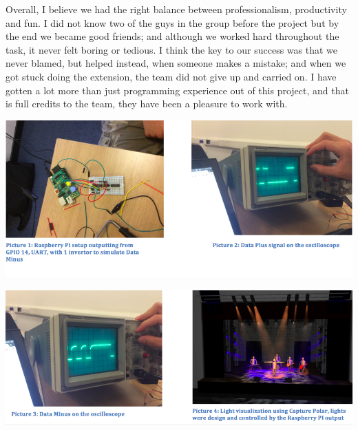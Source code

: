\documentclass[11pt,a4paper]{article}
\begin{document}
Overall, I believe we had the right balance between professionalism, productivity and fun. I did not know two of the guys in the group before the project but by the end we became good friends; and although we worked hard throughout the task, it never felt boring or tedious. I think the key to our success was that we never blamed, but helped instead, when someone makes a mistake; and when we got stuck doing the extension, the team did not give up and carried on. I have gotten a lot more than just programming experience out of this project, and that is full credits to the team, they have been a pleasure to work with.


\newpage


\includegraphics[width=1\linewidth]{images/photo1}

\includegraphics[width=1\linewidth]{images/photo2} 
\end{document}
